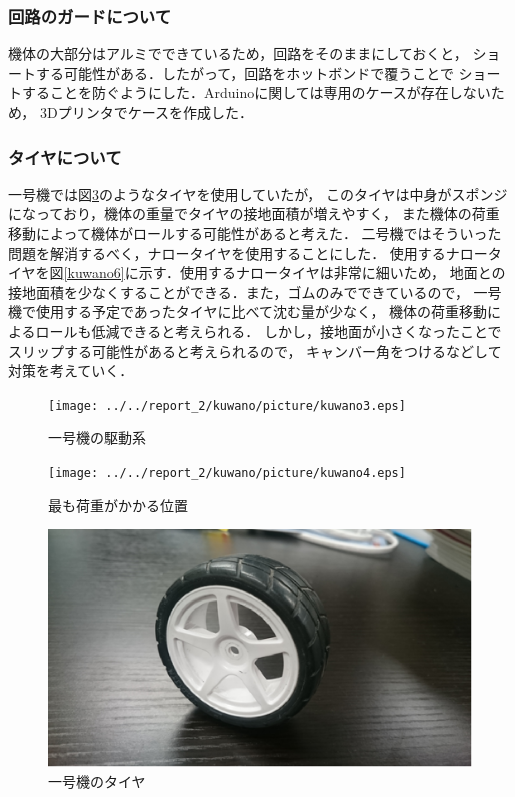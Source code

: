 \documentclass[11pt,a4]{jsarticle}
\begin{document}
\subsubsection{回路のガードについて}
機体の大部分はアルミでできているため，回路をそのままにしておくと，
ショートする可能性がある．したがって，回路をホットボンドで覆うことで
ショートすることを防ぐようにした．Arduinoに関しては専用のケースが存在しないため，
3Dプリンタでケースを作成した．

\subsubsection{タイヤについて}
一号機では図\ref{kuwano5}のようなタイヤを使用していたが，
このタイヤは中身がスポンジになっており，機体の重量でタイヤの接地面積が増えやすく，
また機体の荷重移動によって機体がロールする可能性があると考えた．
二号機ではそういった問題を解消するべく，ナロータイヤを使用することにした．
使用するナロータイヤを図\ref{kuwano6}に示す．使用するナロータイヤは非常に細いため，
地面との接地面積を少なくすることができる．また，ゴムのみでできているので，
一号機で使用する予定であったタイヤに比べて沈む量が少なく，
機体の荷重移動によるロールも低減できると考えられる．
しかし，接地面が小さくなったことでスリップする可能性があると考えられるので，
キャンバー角をつけるなどして対策を考えていく．

\begin{figure}[H]
  \begin{center}
    \texttt{[image: ../../report\_2/kuwano/picture/kuwano3.eps]}
    \caption{一号機の駆動系}
    \label{kuwano3}
  \end{center}
\end{figure}

\begin{figure}[H]
  \begin{center}
    \texttt{[image: ../../report\_2/kuwano/picture/kuwano4.eps]}
    \caption{最も荷重がかかる位置}
    \label{kuwano4}
  \end{center}
\end{figure}

\begin{figure}[H]
  \begin{center}
    \includegraphics[width=0.55\hsize]{../../report_2/kuwano/picture/kuwano5.eps}
    \caption{一号機のタイヤ}
    \label{kuwano5}
  \end{center}
\end{figure}
\end{document}
